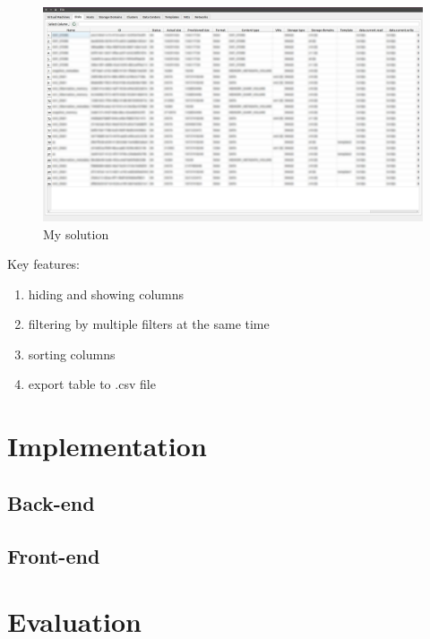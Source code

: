 \begin{figure}[H]
\centering
\includegraphics[scale=0.25]{tabulka.jpg}
\caption{My solution}
\end{figure}

Key features:
\begin{enumerate}
\item hiding and showing columns
\item filtering by multiple filters at the same time
\item sorting columns
\item export table to .csv file
\end{enumerate}


\chapter{Implementation}

\section{Back-end}

\section{Front-end}


\chapter{Evaluation}



